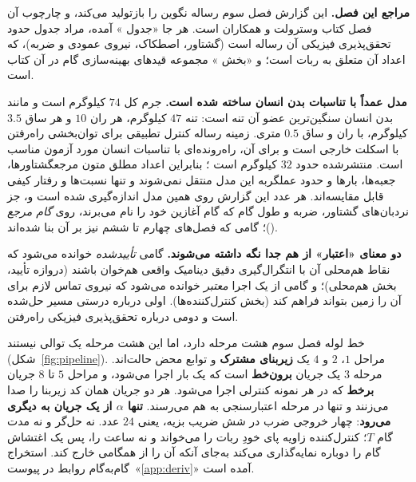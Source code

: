 \documentclass[10pt,twocolumn]{article}
\newcommand{\en}[1]{\lr{#1}}
\newcommand{\md}{\lr{\textemdash}}
\begin{document}
\textbf{مراجع این فصل.} این گزارش فصل سوم رساله نگوین \cite{nguyen2017thesis} را بازتولید
می‌کند، و چارچوب آن فصل کتاب وسترولت و همکاران \cite{westervelt2007feedback} است. هر جا
«جدول \en{3.1}» آمده، مراد جدول حدود تحقق‌پذیری فیزیکی آن رساله است (گشتاور، اصطکاک، نیروی
عمودی و ضربه)، که اعداد آن متعلق به ربات \en{ATRIAS} است؛ و «بخش \en{6.3.4}» مجموعه قیدهای
بهینه‌سازی گام در آن کتاب است.

\textbf{مدل عمداً با تناسبات بدن انسان ساخته شده است.} جرم کل $74$ کیلوگرم است و مانند بدن
انسان سنگین‌ترین عضو آن تنه است: تنه $47$ کیلوگرم، هر ران $10$ و هر ساق $3.5$ کیلوگرم، با ران و
ساق $0.5$ متری. زمینه رساله کنترل تطبیقی برای توان‌بخشی راه‌رفتن با اسکلت خارجی است و برای آن،
راه‌رونده‌ای با تناسبات انسان مورد آزمون مناسب است. \en{RABBIT} منتشرشده حدود $32$ کیلوگرم است
\cite{chevallereau2003rabbit}؛ بنابراین اعداد مطلق متون مرجع\md{}گشتاورها، جعبه‌ها، بارها و
حدود عملگر\md{}به این مدل منتقل نمی‌شوند و تنها نسبت‌ها و رفتار کیفی قابل مقایسه‌اند. هر عدد
این گزارش روی همین مدل اندازه‌گیری شده است و، جز نردبان‌های گشتاور، ضربه و طول گام که گام آغازین
خود را نام می‌برند، روی \emph{گام مرجع} (\en{posture\_195})؛ گامی که فصل‌های چهارم تا ششم نیز
بر آن بنا شده‌اند.

\textbf{دو معنای «اعتبار» از هم جدا نگه داشته می‌شوند.} گامی \emph{تأییدشده} خوانده می‌شود که
نقاط هم‌محلی آن با انتگرال‌گیری دقیق دینامیک واقعی هم‌خوان باشند (دروازه تأیید، بخش
هم‌محلی)؛ و گامی از یک اجرا \emph{معتبر} خوانده می‌شود که نیروی تماس لازم برای آن را زمین
بتواند فراهم کند (بخش کنترل‌کننده‌ها). اولی درباره درستی مسیر حل‌شده است و دومی درباره
تحقق‌پذیری فیزیکی راه‌رفتن.

خط لوله فصل سوم هشت مرحله دارد، اما این هشت مرحله یک توالی نیستند
(شکل~\ref{fig:pipeline}). مراحل $1$، $2$ و $4$ یک \textbf{زیربنای مشترک} و توابع محض
حالت‌اند. مرحله $3$ یک جریان \textbf{برون‌خط} است که یک بار اجرا می‌شود، و مراحل $5$ تا $8$
جریان \textbf{برخط} که در هر نمونه کنترلی اجرا می‌شود. هر دو جریان همان کد زیربنا را صدا
می‌زنند و تنها در مرحله اعتبارسنجی به هم می‌رسند. \textbf{تنها $\alpha$ از یک جریان به دیگری
می‌رود}: چهار خروجی ضرب در شش ضریب بزیه، یعنی $24$ عدد. نه حل‌گر و نه مدت گام $T$؛ کنترل‌کننده
زاویه پای خودِ ربات را می‌خواند و نه ساعت را، پس یک اغتشاش گام را دوباره نمایه‌گذاری می‌کند
به‌جای آنکه آن را از همگامی خارج کند. استخراج گام‌به‌گام روابط در پیوست~«\ref{app:deriv}» آمده است.
\end{document}
